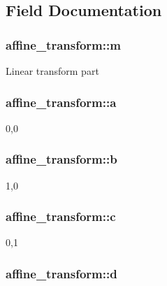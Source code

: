\subsection{Field Documentation}
\hypertarget{structaffine__transform_88bca61da72f5df6dc7c1f36ce367dc6}{
\subsubsection{ {\bf affine\_\-transform::m}}}
\label{structaffine__transform_88bca61da72f5df6dc7c1f36ce367dc6}


Linear transform part \hypertarget{structaffine__transform_a942561b38eb7577dec7ae684349c585}{
\subsubsection{ {\bf affine\_\-transform::a}}}
\label{structaffine__transform_a942561b38eb7577dec7ae684349c585}


0,0 \hypertarget{structaffine__transform_b9024901df32465f83dc1dc2af732a43}{
\subsubsection{ {\bf affine\_\-transform::b}}}
\label{structaffine__transform_b9024901df32465f83dc1dc2af732a43}


1,0 \hypertarget{structaffine__transform_f2e2b13b2149e2034abb5370990f6966}{
\subsubsection{ {\bf affine\_\-transform::c}}}
\label{structaffine__transform_f2e2b13b2149e2034abb5370990f6966}


0,1 \hypertarget{structaffine__transform_98fa7b7718a721dced6c045e6c3fd83b}{
\subsubsection{ {\bf affine\_\-transform::d}}}
\label{structaffine__transform_98fa7b7718a721dced6c045e6c3fd83b}


